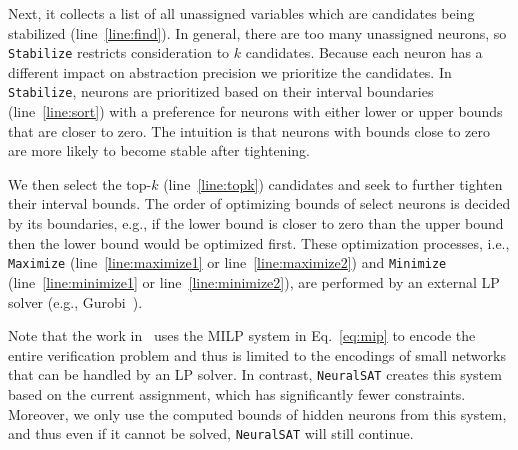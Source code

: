 \documentclass[oneside,11pt,dvipsnames]{book}
\numberwithin{equation}{section}
\theoremstyle{definition}
\theoremstyle{remark}
\newcommand{\functiontextformat}[1]{\textrm{\texttt{#1}}}
\newcommand{\tool}{\texttt{NeuralSAT}}
\begin{document}
Next, it collects a list of all unassigned variables which are candidates being stabilized (line~\ref{line:find}).
In general, there are too many unassigned neurons, so
\functiontextformat{Stabilize} restricts consideration to $k$ candidates.
Because each neuron has a different impact on abstraction precision we prioritize the candidates.
In \functiontextformat{Stabilize}, neurons are prioritized based on their interval boundaries (line~\ref{line:sort}) with a preference for neurons with either lower or upper bounds that are closer to zero.
The intuition is that neurons with bounds close to zero are more likely to become stable after tightening.

We then select the top-$k$ (line~\ref{line:topk}) candidates and seek to further tighten their interval bounds.
The order of optimizing bounds of select neurons is decided by its boundaries, e.g., if the lower bound is closer to zero than the upper bound then the lower bound would be optimized first.
These optimization processes, i.e., \functiontextformat{Maximize} (line~\ref{line:maximize1} or line~\ref{line:maximize2}) and \functiontextformat{Minimize} (line~\ref{line:minimize1} or line~\ref{line:minimize2}), are performed by an external LP solver (e.g., Gurobi~\cite{gurobi}).

Note that the work in~\cite{tjeng2019evaluating} uses the MILP system in Eq.~\ref{eq:mip} to encode the entire verification problem and thus is limited to the encodings of small networks that can be handled by an LP solver.
In contrast, \tool{} creates this system based on the current assignment, which has significantly fewer constraints.
Moreover, we only use the computed bounds of hidden neurons from this system, and thus even if it cannot be solved, \tool{} will still continue.

\end{document}
